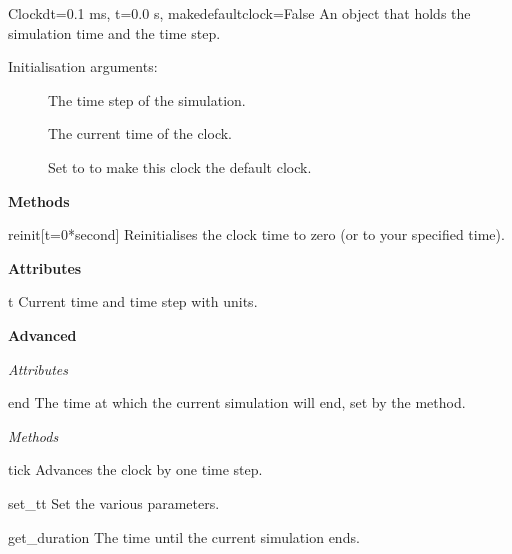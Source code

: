 \documentclass[letterpaper,10pt]{manual}
\begin{document}
\hypertarget{brian.Clock}{}\begin{classdesc}{Clock}{dt=0.1 ms, t=0.0 s, makedefaultclock=False}
An object that holds the simulation time and the time step.

Initialisation arguments:
\begin{description}
\item[]
The time step of the simulation.

\item[]
The current time of the clock.

\item[]
Set to  to make this clock the default clock.

\end{description}

\textbf{Methods}


\hypertarget{brian.Clock.reinit}{}\begin{methoddesc}{reinit}{{[}t=0*second{]}}
Reinitialises the clock time to zero (or to your
specified time).
\end{methoddesc}

\textbf{Attributes}


\hypertarget{brian.Clock.t}{}\begin{memberdesc}{t}
\hypertarget{brian.Clock.dt}{}
Current time and time step with units.
\end{memberdesc}

\textbf{Advanced}

\emph{Attributes}


\hypertarget{brian.Clock.end}{}\begin{memberdesc}{end}
The time at which the current simulation will end,
set by the  method.
\end{memberdesc}

\emph{Methods}


\hypertarget{brian.Clock.tick}{}\begin{methoddesc}{tick}{}
Advances the clock by one time step.
\end{methoddesc}


\hypertarget{brian.Clock.set_t}{}\begin{methoddesc}{set\_t}{t}
\hypertarget{brian.Clock.set_dt}{}
\hypertarget{brian.Clock.set_end}{}
Set the various parameters.
\end{methoddesc}


\hypertarget{brian.Clock.get_duration}{}\begin{methoddesc}{get\_duration}{}
The time until the current simulation ends.
\end{methoddesc}



\end{classdesc}
\end{document}
